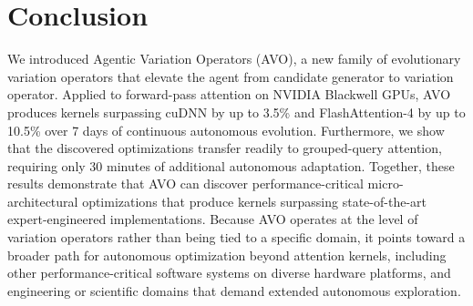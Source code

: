 \section{Conclusion}
\label{sec:conclusion}

We introduced Agentic Variation Operators (AVO), a new family of evolutionary variation operators that elevate the agent from candidate generator to variation operator.
Applied to forward-pass attention on NVIDIA Blackwell GPUs, AVO produces kernels surpassing cuDNN by up to 3.5\% and FlashAttention-4 by up to 10.5\% over 7 days of continuous autonomous evolution.
Furthermore, we show that the discovered optimizations transfer readily to grouped-query attention, requiring only 30 minutes of additional autonomous adaptation.
Together, these results demonstrate that AVO can discover performance-critical micro-architectural optimizations that produce kernels surpassing state-of-the-art expert-engineered implementations.
Because AVO operates at the level of variation operators rather than being tied to a specific domain,  it points toward a broader path for autonomous optimization beyond attention kernels, including other performance-critical software systems on diverse hardware platforms, and engineering or scientific domains that demand extended autonomous exploration.

